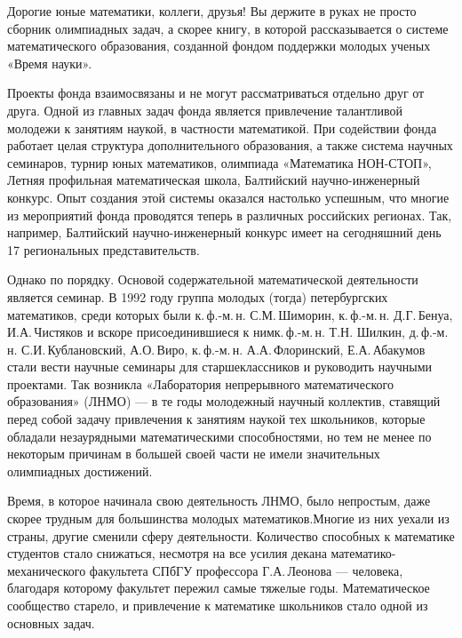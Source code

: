\ms\abz Дорогие юные математики, коллеги, друзья! Вы держите в руках не просто сборник олимпиадных задач, а скорее книгу, в которой рассказывается о системе математического образования, созданной фондом поддержки молодых ученых «Время науки».

\ms\abz Проекты фонда взаимосвязаны и не могут рассматриваться отдельно друг от друга. Одной из главных задач фонда является привлечение талантливой молодежи к занятиям наукой, в частности математикой. При содействии фонда работает целая структура дополнительного образования, а также система научных семинаров, турнир юных математиков, олимпиада «Математика НОН-СТОП», Летняя профильная математическая школа, Балтийский научно-инженерный конкурс. Опыт создания этой системы оказался настолько успешным, что многие из мероприятий фонда проводятся теперь в различных российских регионах. Так, например, Балтийский научно-инженерный конкурс имеет на сегодняшний день 17 региональных представительств.

\ms\abz Однако по порядку. Основой содержательной математической деятельности является семинар. В 1992 году группа  молодых (тогда) петербургских математиков, среди которых были к.\,ф.-м.\,н. С.М.\,Шиморин, к.\,ф.-м.\,н. Д.Г.\,Бенуа, И.А.\,Чистяков и вскоре присоединившиеся к ним\linebreak к.\,ф.-м.\,н. Т.Н. Шилкин, д.\,ф.-м.\,н. С.И.\,Кублановский, А.О.\,Виро, к.\,ф.-м.\,н. А.А.\,Флоринский, Е.А.\,Абакумов стали вести научные семинары для старшеклассников и руководить научными проектами. Так возникла «Лаборатория непрерывного математического образования» (ЛНМО) — в те годы молодежный научный коллектив, ставящий перед собой задачу привлечения к занятиям наукой тех школьников, которые обладали незаурядными математическими способностями, но тем не менее по некоторым причинам в большей своей части не имели значительных олимпиадных достижений.

\ms\abz Время, в которое начинала свою деятельность ЛНМО, было непростым, даже скорее трудным для большинства молодых математиков.\linebreak Многие из них уехали из страны, другие сменили сферу деятельности. Количество способных к математике студентов стало снижаться, несмотря на все усилия декана математико-механического факультета СПбГУ профессора Г.А.\,Леонова — человека, благодаря которому факультет пережил самые тяжелые годы. Математическое сообщество старело, и привлечение к математике школьников стало одной из основных задач.

